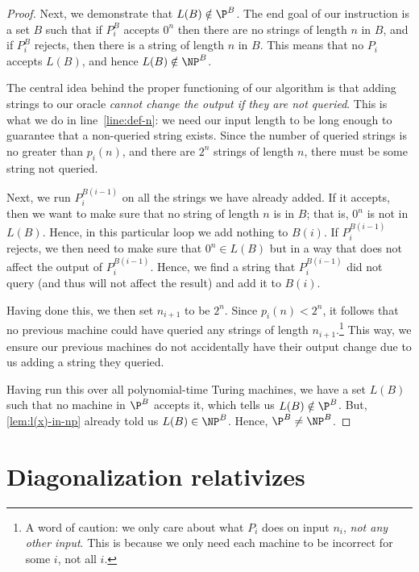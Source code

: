\documentclass[english]{reedthesis}
\theoremstyle{plain}
\theoremstyle{definition}
\theoremstyle{remark}
\begin{document}
\begin{proof}
  Next, we demonstrate that $L(B) \notin \P^{B}$. The end goal of our instruction is
  a set $B$ such that if $P_{i}^{B}$ accepts $0^{n}$ then there are no strings
  of length $n$ in $B$, and if $P_{i}^{B}$ rejects, then there is a string of
  length $n$ in $B$. This means that no $P_{i}$ accepts $L(B)$, and hence
  $L(B) \notin \NP^{B}$.

  The central idea behind the proper functioning of our algorithm is that adding
  strings to our oracle \emph{cannot change the output if they are not queried}.
  This is what we do in line~\ref{line:def-n}: we need our input length to be
  long enough to guarantee that a non-queried string exists. Since the number of
  queried strings is no greater than $p_{i}(n)$, and there are $2^{n}$ strings
  of length $n$, there must be some string not queried.

  Next, we run $P_{i}^{B(i-1)}$ on all the strings we have already added. If it
  accepts, then we want to make sure that no string of length $n$ is in $B$;
  that is, $0^{n}$ is not in $L(B)$. Hence, in this particular loop we add
  nothing to $B(i)$. If $P_{i}^{B(i-1)}$ rejects, we then need to make sure that
  $0^{n} \in L(B)$ but in a way that does not affect the output of
  $P_{i}^{B(i-1)}$. Hence, we find a string that $P_{i}^{B(i-1)}$ did not query
  (and thus will not affect the result) and add it to $B(i)$.

  Having done this, we then set $n_{i+1}$ to be $2^{n}$. Since
  $p_{i}(n) < 2^{n}$, it follows that no previous machine could have queried any
  strings of length $n_{i+1}$.\footnote{A word of caution: we only care about
    what $P_{i}$ does on input $n_{i}$, \emph{not any other input}. This is
    because we only need each machine to be incorrect for some $i$, not all
    $i$.} This way, we ensure our previous machines do not accidentally have
  their output change due to us adding a string they queried.

  Having run this over all polynomial-time Turing machines, we have a set $L(B)$
  such that no machine in $\P^{B}$ accepts it, which tells us $L(B) \notin \P^{B}$.
  But, \cref{lem:l(x)-in-np} already told us $L(B) \in \NP^{B}$. Hence,
  $\P^{B} \ne \NP^{B}$.
\end{proof}

\section{Diagonalization relativizes}\label{sec:diag-relativizes}
\end{document}

